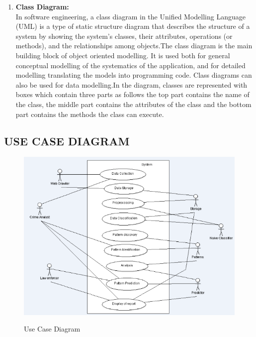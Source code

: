 \documentclass[12pt]{extreport}
\begin{document}
\begin{enumerate}
\item \textbf{Class Diagram:}\\
In software engineering, a class diagram in the Unified Modelling Language (UML) is a type of
static structure diagram that describes the structure of a system by showing the system's classes, their attributes, operations (or
methods), and the relationships among objects.The class diagram is the main building block of object oriented modelling. It is used both for general
conceptual modelling of the systematics of the application, and for detailed modelling translating the models into programming code. Class diagrams can also be used for data modelling.In the diagram, classes are represented with boxes which contain
three parts as follows the top part contains the name of the class, the middle part contains the attributes of the class and the bottom part contains the methods the class can execute.\\

\end{enumerate}

\pagebreak
    \subsection{USE CASE DIAGRAM}
    \begin{figure}[H]
    \centering
  \includegraphics[scale=0.75]{USECRIME.png}\\
  \caption{Use Case Diagram}
  
\end{figure}
    \pagebreak
\end{document}
